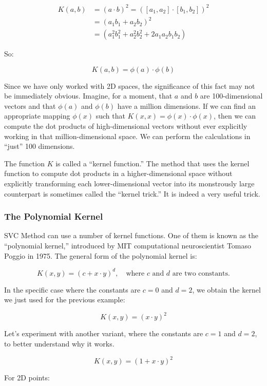 \documentclass[11pt]{article}
\begin{document}
\begin{align*}
K(a, b) &= (a \cdot b)^2 = ([a_1, a_2] \cdot [b_1, b_2])^2 \\
&= (a_1b_1 + a_2b_2)^2 \\
&= (a_1^2b_1^2 + a_2^2b_2^2 + 2a_1a_2b_1b_2)
\end{align*}

So:

$$
K(a, b) = \phi(a) \cdot \phi(b)
$$

Since we have only worked with 2D spaces, the significance of this fact
may not be immediately obvious. Imagine, for a moment, that $a$ and
$b$ are 100-dimensional vectors and that $\phi(a)$ and $\phi(b)$
have a million dimensions. If we can find an appropriate mapping
$\phi(x)$ such that $K(x, x) = \phi(x) \cdot \phi(x)$, then we can
compute the dot products of high-dimensional vectors without ever
explicitly working in that million-dimensional space. We can perform the
calculations in ``just'' 100 dimensions.

The function $K$ is called a ``kernel function.'' The method that uses
the kernel function to compute dot products in a higher-dimensional
space without explicitly transforming each lower-dimensional vector into
its monstrously large counterpart is sometimes called the ``kernel
trick.'' It is indeed a very useful trick.

\subsubsection{The Polynomial Kernel}\label{the-polynomial-kernel}

SVC Method can use a number of kernel functions. One of them is known as
the ``polynomial kernel,'' introduced by MIT computational
neuroscientist Tomaso Poggio in 1975. The general form of the polynomial
kernel is:

$$
K(x, y) = (c + x \cdot y)^d, \quad \text{where } c \text{ and } d \text{ are two constants.}
$$

In the specific case where the constants are $c = 0$ and $d = 2$, we
obtain the kernel we just used for the previous example:

$$
K(x, y) = (x \cdot y)^2
$$

Let's experiment with another variant, where the constants are $c = 1$
and $d = 2$, to better understand why it works.

$$
K(x, y) = (1 + x \cdot y)^2
$$

For 2D points:
\end{document}
